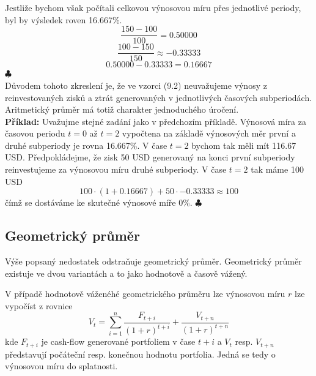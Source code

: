 \documentclass[a4paper]{book}
\begin{document}
Jestliže bychom však počítali celkovou výnosovou míru přes jednotlivé periody, byl by výsledek roven 16.667\%.
\begin{equation*}
\frac{150-100}{100} = 0.50000
\end{equation*}
\begin{equation*}
\frac{100-150}{150} \approx -0.33333
\end{equation*}
\begin{equation*}
0.50000 - 0.33333 = 0.16667
\end{equation*}
$\clubsuit$\\

Důvodem tohoto zkreslení je, že ve vzorci (9.2) neuvažujeme výnosy z reinvestovaných zisků a ztrát generovaných v jednotlivých časových subperiodách. Aritmetický průměr má totiž charakter jednoduchého úročení.\\

\noindent \textbf{Příklad:} Uvažujme stejné zadání jako v předchozím příkladě. Výnosová míra za časovou periodu $t=0$ až $t=2$ vypočtena na základě výnosových měr první a druhé subperiody je rovna 16.667\%. V čase $t=2$ bychom tak měli mít 116.67 USD. Předpokládejme, že zisk 50 USD generovaný na konci první subperiody reinvestujeme za výnosovou míru druhé subperiody. V čase $t=2$ tak máme 100 USD
\begin{equation*}
100 \cdot (1 + 0.16667) + 50 \cdot - 0.33333 \approx 100 
\end{equation*} 
čímž se dostáváme ke skutečné výnosové míře 0\%. $\clubsuit$\\

\subsection{Geometrický průměr}

Výše popsaný nedostatek odstraňuje geometrický průměr. Geometrický průměr existuje ve dvou variantách a to jako hodnotově a časově vážený.

V případě hodnotově váženéhé geometrického průměru lze výnosovou míru $r$ lze vypočíst z rovnice
\begin{equation*}
V_t = \sum_{i=1}^n \frac{F_{t+i}}{(1+r)^{t+i}} + \frac{V_{t+n}}{(1 + r)^{t+n}}
\end{equation*}
kde $F_{t+i}$ je cash-flow generované portfoliem v čase $t+i$ a $V_t$ resp. $V_{t+n}$ představují počáteční resp. konečnou hodnotu portfolia. Jedná se tedy o výnosovou míru do splatnosti.\\
\end{document}
